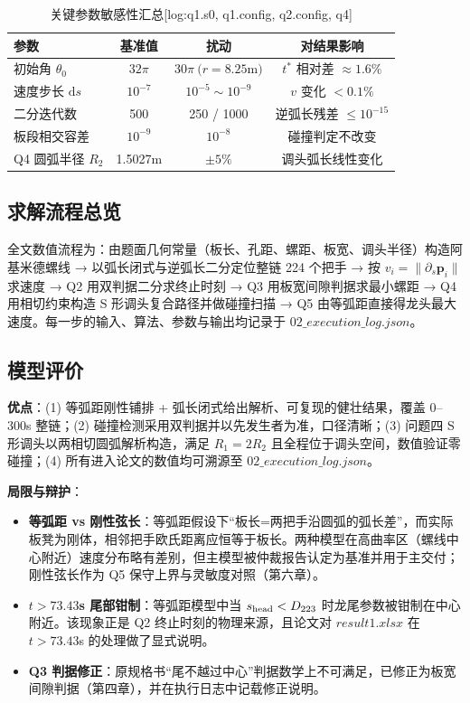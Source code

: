 \begin{table}[H]\centering\small
\caption{关键参数敏感性汇总[log:q1.s0, q1.config, q2.config, q4]}
\label{tab:sens}
\begin{tabular}{lccc}
\toprule
参数 & 基准值 & 扰动 & 对结果影响 \\
\midrule
初始角 $\theta_0$ & $32\pi$ & $30\pi\ (r=8.25$m$)$ & $t^{\ast}$ 相对差 $\approx1.6\%$ \\
速度步长 $\mathrm{d}s$ & $10^{-7}$ & $10^{-5}\sim10^{-9}$ & $v$ 变化 $<0.1\%$ \\
二分迭代数 & 500 & 250 / 1000 & 逆弧长残差 $\le10^{-15}$ \\
板段相交容差 & $10^{-9}$ & $10^{-8}$ & 碰撞判定不改变 \\
Q4 圆弧半径 $R_2$ & 1.5027m & $\pm 5\%$ & 调头弧长线性变化 \\
\bottomrule
\end{tabular}
\end{table}

\subsection{求解流程总览}
全文数值流程为：由题面几何常量（板长、孔距、螺距、板宽、调头半径）构造阿基米德螺线 → 以弧长闭式与逆弧长二分定位整链 224 个把手 → 按 $v_i=\lVert\partial_s\mathbf p_i\rVert$ 求速度 → Q2 用双判据二分求终止时刻 → Q3 用板宽间隙判据求最小螺距 → Q4 用相切约束构造 S 形调头复合路径并做碰撞扫描 → Q5 由等弧距直接得龙头最大速度。每一步的输入、算法、参数与输出均记录于 $02\_execution\_log.json$。

\subsection{模型评价}
\textbf{优点}：(1) 等弧距刚性铺排 + 弧长闭式给出解析、可复现的健壮结果，覆盖 0--300s 整链；(2) 碰撞检测采用双判据并以先发生者为准，口径清晰；(3) 问题四 S 形调头以两相切圆弧解析构造，满足 $R_1=2R_2$ 且全程位于调头空间，数值验证零碰撞；(4) 所有进入论文的数值均可溯源至 $02\_execution\_log.json$。

\textbf{局限与辩护}：
\begin{itemize}
\item \textbf{等弧距 vs 刚性弦长}：等弧距假设下“板长=两把手沿圆弧的弧长差”，而实际板凳为刚体，相邻把手欧氏距离应恒等于板长。两种模型在高曲率区（螺线中心附近）速度分布略有差别，但主模型被仲裁报告认定为基准并用于主交付；刚性弦长作为 Q5 保守上界与灵敏度对照（第六章）。
\item \textbf{$t>73.43$s 尾部钳制}：等弧距模型中当 $s_{\rm head}<D_{223}$ 时龙尾参数被钳制在中心附近。该现象正是 Q2 终止时刻的物理来源，且论文对 $result1.xlsx$ 在 $t>73.43$s 的处理做了显式说明。
\item \textbf{Q3 判据修正}：原规格书“尾不越过中心”判据数学上不可满足，已修正为板宽间隙判据（第四章），并在执行日志中记载修正说明。
\end{itemize}

